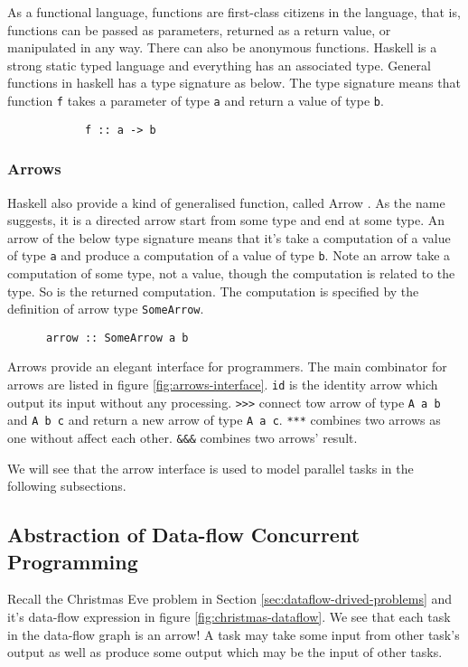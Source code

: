 \documentclass[conference]{IEEEtran}
\begin{document}
As a functional language, functions are first-class citizens in the language, that is, functions can be
passed as parameters, returned as a return value, or manipulated in any way. There can also be
anonymous functions. Haskell is a strong static typed language and everything has an associated type.
General functions in haskell has a type signature as below.
The type signature means that function \texttt{f} takes a parameter of
type \texttt{a} and return a value of type \texttt{b}.
\begin{verbatim}
            f :: a -> b
\end{verbatim}

\subsubsection{Arrows}
Haskell also provide a kind of generalised function, called Arrow \cite{Hughes2005}.
As the name suggests, it is
a directed arrow start from some type and end at some type. An arrow of the below type signature
means that it's take a computation of a value of type \texttt{a} and produce a computation of a value
of type \texttt{b}. Note an arrow take a computation of some type, not a value, though
the computation is related to the type. So is the returned computation. The computation is specified
by the definition of arrow type \texttt{SomeArrow}.
\begin{verbatim}
      arrow :: SomeArrow a b
\end{verbatim}

Arrows provide an elegant interface for programmers. The main combinator for arrows are listed in figure
\ref{fig:arrows-interface}. \texttt{id} is the identity arrow which output its input without any processing.
\texttt{>>>} connect tow arrow of type \texttt{A a b} and \texttt{A b c} and return a new arrow of type
\texttt{A a c}. \texttt{***} combines two arrows as one without affect each other. \texttt{\&\&\&} combines
two arrows' result.

We will see that the arrow interface is used to model parallel tasks in the following subsections.

\subsection{Abstraction of Data-flow Concurrent Programming}\label{subsec:abstraction-of-dataflow}
Recall the Christmas Eve problem in Section \ref{sec:dataflow-drived-problems}
and it's data-flow expression in figure \ref{fig:christmas-dataflow}.
We see that each task in the data-flow graph is an arrow! A task
may take some input from other task's output as well as produce some output which may be the
input of other tasks.
\end{document}
